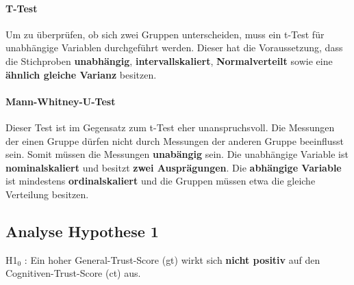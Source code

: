 \documentclass[a4paper,11pt]{article}%
\renewcommand{\\}{\vspace*{0.5\baselineskip} \newline}
\begin{document}
\paragraph{T-Test}
Um zu überprüfen, ob sich zwei  Gruppen unterscheiden, muss ein t-Test für unabhängige Variablen durchgeführt werden.
Dieser hat die Voraussetzung, dass die Stichproben \textbf{unabhängig}, \textbf{intervallskaliert}, \textbf{Normalverteilt} sowie eine \textbf{ähnlich gleiche Varianz} besitzen.

\paragraph{Mann-Whitney-U-Test}
Dieser Test ist im Gegensatz zum t-Test eher unanspruchsvoll. Die Messungen der einen Gruppe dürfen nicht durch Messungen der anderen Gruppe beeinflusst sein. Somit müssen die Messungen \textbf{unabängig} sein. Die unabhängige Variable ist \textbf{nominalskaliert} und besitzt \textbf{zwei Ausprägungen}. Die \textbf{abhängige Variable} ist mindestens \textbf{ordinalskaliert}  und die Gruppen müssen etwa die gleiche Verteilung besitzen. \citep{eid2017statistik}

\newpage
	\subsection{Analyse Hypothese 1}
H1$_{0}$ : Ein hoher General-Trust-Score (\ac{gt}) wirkt sich \textbf{nicht positiv} auf den Cognitiven-Trust-Score (\ac{ct}) aus.


\end{document}
